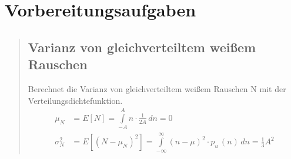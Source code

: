 %     






\section{Vorbereitungsaufgaben}
\begin{quote}
    \hspace{-2em}
    \subsection{Varianz von gleichverteiltem weißem Rauschen}
    Berechnet die Varianz von gleichverteiltem weißem Rauschen N mit der Verteilungsdichtefunktion.\\
    
     \begin{equation*}
    	\begin{split}
    	    \mu_{N}&=E[N]=\int\limits_{-A}^{A} n \cdot \frac{1}{2A} \,dn=0 \\
    		\sigma_{N}^2&=E[(N-\mu_{N})^2]=\int\limits_{-\infty}^{\infty} (n-\mu)^2
    		\cdot p_{u}\,(n) \,dn=\frac{1}{3}A^2
    	\end{split}
     \end{equation*}
    
    
    \begin{quote}
    
    \end{quote}
      
\end{quote}



